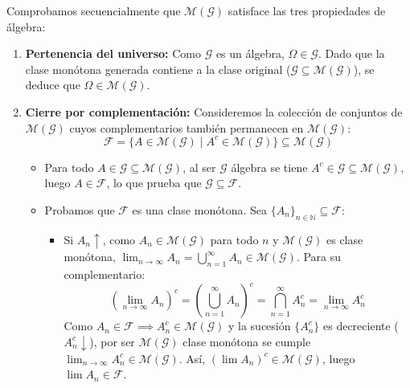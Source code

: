 \begin{demostracion}
Comprobamos secuencialmente que $\mathcal{M}(\mathcal{G})$ satisface las tres propiedades de álgebra:

\begin{enumerate}
    \item \textbf{Pertenencia del universo:}
    Como $\mathcal{G}$ es un álgebra, $\Omega \in \mathcal{G}$. Dado que la clase monótona generada contiene a la clase original ($\mathcal{G} \subseteq \mathcal{M}(\mathcal{G})$), se deduce que $\Omega \in \mathcal{M}(\mathcal{G})$.

    \item \textbf{Cierre por complementación:}
    Consideremos la colección de conjuntos de $\mathcal{M}(\mathcal{G})$ cuyos complementarios también permanecen en $\mathcal{M}(\mathcal{G})$:
    \[
        \mathcal{F} = \{ A \in \mathcal{M}(\mathcal{G}) \mid A^c \in \mathcal{M}(\mathcal{G}) \} \subseteq \mathcal{M}(\mathcal{G})
    \]
    \begin{itemize}
        \item Para todo $A \in \mathcal{G} \subseteq \mathcal{M}(\mathcal{G})$, al ser $\mathcal{G}$ álgebra se tiene $A^c \in \mathcal{G} \subseteq \mathcal{M}(\mathcal{G})$, luego $A \in \mathcal{F}$, lo que prueba que $\mathcal{G} \subseteq \mathcal{F}$.
        \item Probamos que $\mathcal{F}$ es una clase monótona. Sea $\{A_n\}_{n \in \mathbb{N}} \subseteq \mathcal{F}$:
        \begin{itemize}
            \item Si $A_n \uparrow$, como $A_n \in \mathcal{M}(\mathcal{G})$ para todo $n$ y $\mathcal{M}(\mathcal{G})$ es clase monótona, $\displaystyle \lim_{n \to \infty} A_n = \bigcup_{n=1}^\infty A_n \in \mathcal{M}(\mathcal{G})$. Para su complementario:
            \[
                \left( \lim_{n \to \infty} A_n \right)^c = \left( \bigcup_{n=1}^\infty A_n \right)^c = \bigcap_{n=1}^\infty A_n^c = \lim_{n \to \infty} A_n^c
            \]
            Como $A_n \in \mathcal{F} \implies A_n^c \in \mathcal{M}(\mathcal{G})$ y la sucesión $\{A_n^c\}$ es decreciente ($A_n^c \downarrow$), por ser $\mathcal{M}(\mathcal{G})$ clase monótona se cumple $\displaystyle \lim_{n \to \infty} A_n^c \in \mathcal{M}(\mathcal{G})$. Así, $\left(\lim A_n\right)^c \in \mathcal{M}(\mathcal{G})$, luego $\lim A_n \in \mathcal{F}$.


\end{itemize}
\end{itemize}
\end{enumerate}
\end{demostracion}
